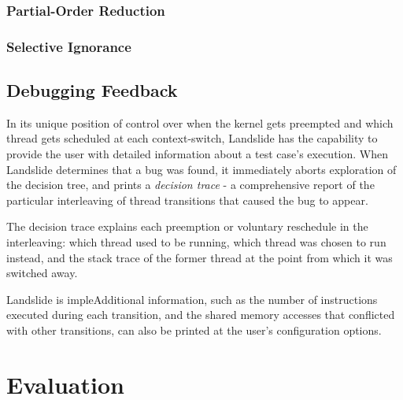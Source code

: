 \documentclass[10pt,twocolumn]{article}
\begin{document}
\subsubsection{Partial-Order Reduction}

\subsubsection{Selective Ignorance}

\subsection{Debugging Feedback}

In its unique position of control over when the kernel gets preempted and which thread gets scheduled at each context-switch, Landslide has the capability to provide the user with detailed information about a test case's execution.
When Landslide determines that a bug was found, it immediately aborts exploration of the decision tree, and prints a {\em decision trace} - a comprehensive report of the particular interleaving of thread transitions that caused the bug to appear.

The decision trace explains each preemption or voluntary reschedule in the interleaving: which thread used to be running, which thread was chosen to run instead, and the stack trace of the former thread at the point from which it was switched away.


Landslide is impleAdditional information, such as the number of instructions executed during each transition, and the shared memory accesses that conflicted with other transitions, can also be printed at the user's configuration options.



\section{Evaluation}
\end{document}
